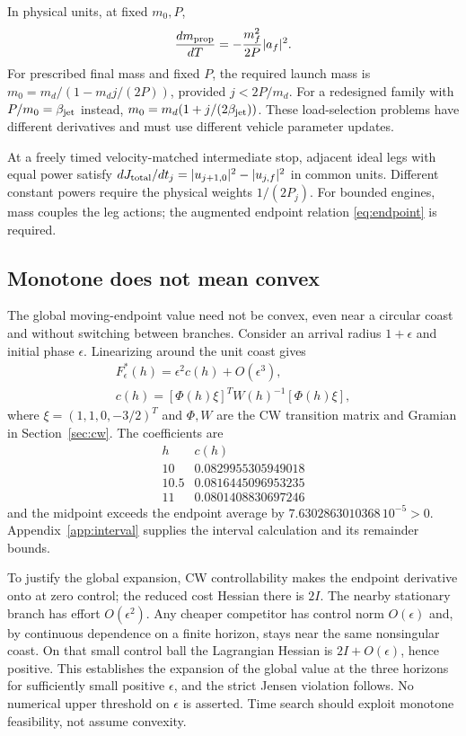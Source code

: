 In physical units, at fixed $m_0,P$,
\begin{equation}
 \frac{dm_{\rm prop}}{dT}=-\frac{m_f^2}{2P}|a_f|^2.
\end{equation}
For prescribed final mass and fixed $P$, the required launch mass is
$m_0=m_d/(1-m_dj/(2P))$, provided $j<2P/m_d$.
For a redesigned family with $P/m_0=\beta_{\rm jet}$ instead,
$m_0=m_d(1+j/(2\beta_{\rm jet}))$. These load-selection problems have different
derivatives and must use different vehicle parameter updates.

At a freely timed velocity-matched intermediate stop, adjacent ideal
legs with equal power satisfy
$dJ_{\rm total}/dt_j=|u_{j+1,0}|^2-|u_{j,f}|^2$ in common units.
Different constant powers require the physical weights $1/(2P_j)$.
For bounded engines, mass couples the leg actions; the augmented
endpoint relation \eqref{eq:endpoint} is required.

\subsection{Monotone does not mean convex}
The global moving-endpoint value need not be convex, even near a
circular coast and without switching between branches. Consider an
arrival radius $1+\epsilon$ and initial phase $\epsilon$.
Linearizing around the unit coast gives
\begin{equation}
 \begin{gathered}
 F_\epsilon^*(h)=\epsilon^2 c(h)+O(\epsilon^3),\\
 c(h)=[\Phi(h)\xi]^TW(h)^{-1}[\Phi(h)\xi],
 \end{gathered}
 \label{eq:nonconvex}
\end{equation}
where $\xi=(1,1,0,-3/2)^T$ and $\Phi,W$ are the CW transition matrix
and Gramian in Section~\ref{sec:cw}. The coefficients are
\begin{equation}
 \begin{array}{c|c}
 h&c(h)\\\hline
 10&0.0829955305949018\\
 10.5&0.0816445096953235\\
 11&0.0801408830697246
 \end{array}
\end{equation}
and the midpoint exceeds the endpoint average by
$7.6302863010368\,10^{-5}>0$. Appendix~\ref{app:interval} supplies the interval calculation and its remainder bounds.

To justify the global expansion, CW controllability makes the endpoint
derivative onto at zero control; the reduced cost Hessian there is $2I$.
The nearby stationary branch has effort $O(\epsilon^2)$. Any cheaper
competitor has control norm $O(\epsilon)$ and, by continuous dependence
on a finite horizon, stays near the same nonsingular coast. On that
small control ball the Lagrangian Hessian is $2I+O(\epsilon)$, hence
positive. This establishes the expansion of the global value at the
three horizons for sufficiently small positive $\epsilon$, and the
strict Jensen violation follows. No numerical upper threshold on
$\epsilon$ is asserted. Time search should exploit monotone feasibility,
not assume convexity.
